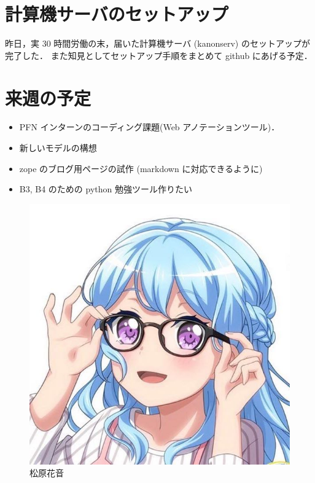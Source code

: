 \documentclass[onecolumn]{ujarticle}     %
\begin{document}
	\section{計算機サーバのセットアップ}
	昨日，実 30 時間労働の末，届いた計算機サーバ (kanonserv) のセットアップが完了した．
	また知見としてセットアップ手順をまとめて github にあげる予定．

	\section{来週の予定}
	\begin{itemize}
		\item PFN インターンのコーディング課題(Web アノテーションツール)．
		\item 新しいモデルの構想
		\item zope のブログ用ページの試作 (markdown に対応できるように)
		\item B3, B4 のための python 勉強ツール作りたい 
	\end{itemize}
	
	\newpage\newpage
	\begin{figure}[h]
		\begin{center}
			\hspace{30mm}
			\includegraphics[width=0.8\columnwidth]{kanon.jpg}
			\caption{松原花音}
		\end{center}
	\end{figure}
	
	
	
	
	
\end{document}
